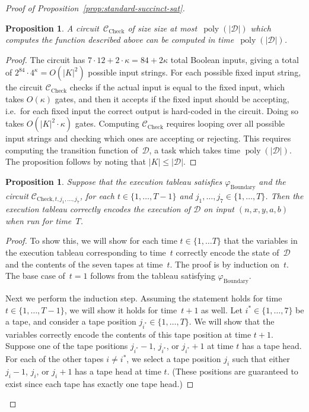 \documentclass[11pt]{article}
\newtheorem{proposition}[theorem]{Proposition}
\theoremstyle{definition}
\DeclareMathOperator{\poly}{poly}
\newcommand{\decider}{\mathcal{D}}
\newcommand{\circuit}{\mathcal{C}}
\begin{document}
\begin{proof}[Proof of Proposition~\ref{prop:standard-succinct-sat}]
  \begin{proposition}\label{prop:check-size}
    A circuit~$\circuit_{\mathrm{Check}}$ of size size at most~$\poly(|\decider|)$ which computes the function described above can be computed in time~$\poly(|\decider|)$.
  \end{proposition}
	
  \begin{proof}
    The circuit has $7 \cdot 12 + 2\cdot \kappa = 84 + 2\kappa$ total Boolean
    inputs, giving a total of $2^{84} \cdot 4^\kappa = O(|K|^2)$ possible input
    strings.
    For each possible fixed input string, the circuit $\circuit_{\mathrm{Check}}$ checks
    if the actual input is equal to the fixed input, which takes $O(\kappa)$
    gates, and then it accepts if the fixed input should be accepting, i.e.\ for each fixed input the correct output is hard-coded in the circuit. Doing so takes $O(|K|^2 \cdot \kappa)$ gates.
    Computing $\circuit_{\mathrm{Check}}$ requires looping over all possible
    input strings and checking which ones are accepting or rejecting.
    This requires computing the transition function of~$\decider$, a task which
    takes time $\poly(|\decider|)$.
    The proposition follows by noting that $|K| \leq |\decider|$.
\end{proof}

\begin{proposition}\label{prop:correct-tableau}
  Suppose that the execution tableau satisfies $\varphi_{\mathrm{Boundary}}$ and
  the circuit $\circuit_{\mathrm{Check}, t, j_1, \ldots, j_7}$, for each $t \in
  \{1, \ldots, T-1\}$ and $j_1, \ldots, j_7 \in \{1, \ldots, T\}$.
  Then the execution tableau correctly encodes the execution of $\decider$ on
  input $(n, x,y, a, b)$ when run for time~$T$.
\end{proposition}
\begin{proof}
  To show this, we will show for each time $t \in \{1, \ldots T\}$ that the
  variables in the execution tableau corresponding to time~$t$ correctly encode
  the state of~$\decider$ and the contents of the seven tapes at time~$t$.
  The proof is by induction on~$t$.
  The base case of~$t=1$ follows from the tableau satisfying
  $\varphi_{\mathrm{Boundary}}$.

  Next we perform the induction step.
  Assuming the statement holds for time $t \in \{1, \ldots, T-1\}$, we will show
  it holds for time~$t+1$ as well.
  Let $i^* \in \{1, \ldots, 7\}$ be a tape, and consider a tape position
  $j_{i^*} \in \{1, \ldots, T\}$.
  We will show that the variables correctly encode the contents of this tape
  position at time $t+1$.
  Suppose one of the tape positions $j_{i^*}-1$, $j_{i^*}$, or $j_{i^*}+1$ at
  time $t$ has a tape head.
  For each of the other tapes $i \neq i^*$, we select a tape position $j_{i}$
  such that either $j_{i}-1$, $j_{i}$, or $j_{i}+1$ has a tape head at time $t$.
  (These positions are guaranteed to exist since each tape has exactly one tape
  head.)
  

\end{proof}
\end{proof}
\end{document}
